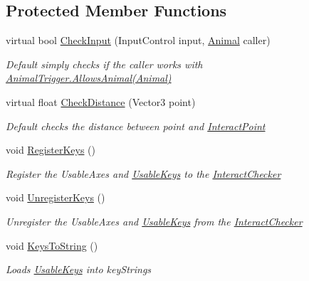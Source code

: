 \subsection*{Protected Member Functions}
\begin{DoxyCompactItemize}
\item 
virtual bool \mbox{\hyperlink{class_attachable_interact_a7efc3c845dc5112e6c744eee254094e6}{Check\+Input}} (Input\+Control input, \mbox{\hyperlink{class_animal}{Animal}} caller)
\begin{DoxyCompactList}\small\item\em Default simply checks if the {\itshape caller}  works with \mbox{\hyperlink{class_animal_trigger_ae8394dfcf5f91b8c413959a4d6baa3a9}{Animal\+Trigger.\+Allows\+Animal(\+Animal)}} \end{DoxyCompactList}\item 
virtual float \mbox{\hyperlink{class_attachable_interact_aa6b840e4c36f09981e31b2b33bc9d45a}{Check\+Distance}} (Vector3 point)
\begin{DoxyCompactList}\small\item\em Default checks the distance between {\itshape point}  and \mbox{\hyperlink{class_attachable_interact_ad46e0ca3808d58ab5e1102e379d6cb7e}{Interact\+Point}} \end{DoxyCompactList}\item 
void \mbox{\hyperlink{class_attachable_interact_afdc25b120520c75cf102b314877c498b}{Register\+Keys}} ()
\begin{DoxyCompactList}\small\item\em Register the Usable\+Axes and \mbox{\hyperlink{class_attachable_interact_a3c3ffc1d5b3cfd3bc9b4fde20a772901}{Usable\+Keys}} to the \mbox{\hyperlink{class_interact_checker}{Interact\+Checker}} \end{DoxyCompactList}\item 
void \mbox{\hyperlink{class_attachable_interact_ab657260ae7954daa9d4c5f938790910d}{Unregister\+Keys}} ()
\begin{DoxyCompactList}\small\item\em Unregister the Usable\+Axes and \mbox{\hyperlink{class_attachable_interact_a3c3ffc1d5b3cfd3bc9b4fde20a772901}{Usable\+Keys}} from the \mbox{\hyperlink{class_interact_checker}{Interact\+Checker}} \end{DoxyCompactList}\item 
void \mbox{\hyperlink{class_attachable_interact_a346d5fc16847e2c6c0349b3387ceab45}{Keys\+To\+String}} ()
\begin{DoxyCompactList}\small\item\em Loads \mbox{\hyperlink{class_attachable_interact_a3c3ffc1d5b3cfd3bc9b4fde20a772901}{Usable\+Keys}} into key\+Strings \end{DoxyCompactList}\item 

\end{DoxyCompactItemize}
